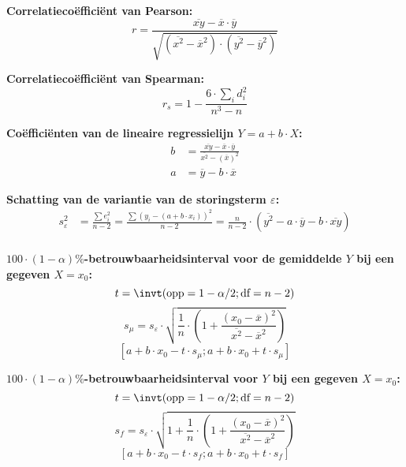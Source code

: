\textbf{Correlatieco\"effici\"ent van Pearson:}
\[
    r = \frac{\overline{xy} - \overline{x} \cdot \overline{y}}{\sqrt{(\overline{x^2} - \overline{x}^2)\cdot(\overline{y^2} - \overline{y}^2)}}
\]

\textbf{Correlatieco\"effici\"ent van Spearman:}
\[
    r_s = 1 - \frac{6 \cdot \sum_i d_i^2}{n^3-n}
\]

\textbf{Co\"effici\"enten van de lineaire regressielijn $Y = a + b\cdot X$:}
\begin{align*}
    b &= \frac{\overline{xy} - \overline{x} \cdot \overline{y}}{\overline{x^2} - (\overline{x})^2} \\
    a &= \overline{y} - b \cdot \overline{x}
\end{align*}

\textbf{Schatting van de variantie van de storingsterm $\varepsilon$:}
\begin{align*}
    s_{\varepsilon}^2 &= \frac{\sum e_i^2}{n - 2} = \frac{\sum \left(y_i - (a + b \cdot x_i)\right)^2}{n - 2}=  \frac{n}{n-2} \cdot \left( \overline{y^2} - a \cdot \overline{y} - b \cdot \overline{xy} \right) \\ 
\end{align*}

\textbf{\boldmath$100\cdot(1-\alpha)\%$-betrouwbaarheidsinterval voor de gemiddelde $Y$ bij een gegeven $X = x_0$:}
\[
    t = \invt(\text{opp} = 1 - \alpha/2; \text{df} = n - 2)
\]
\[
    s_\mu = s_{\varepsilon} \cdot \sqrt{ \frac{1}{n} \cdot \left( 1 + \frac{(x_0 - \overline{x})^2}{\overline{x^2} - \overline{x}^2} \right) }
\]
\[
    [a+b\cdot x_0 - t \cdot s_\mu; a+b\cdot x_0 + t \cdot s_\mu]
\]

\textbf{\boldmath$100\cdot(1-\alpha)\%$-betrouwbaarheidsinterval voor $Y$ bij een gegeven $X = x_0$:}
\[
    t = \invt(\text{opp} = 1 - \alpha/2; \text{df} = n - 2)
\]
\[
    s_f = s_{\varepsilon} \cdot \sqrt{ 1 + \frac{1}{n} \cdot \left( 1 + \frac{(x_0 - \overline{x})^2}{\overline{x^2} - \overline{x}^2} \right) }
\]
\[
    [a+b\cdot x_0 - t \cdot s_f; a+b\cdot x_0 + t \cdot s_f]
\]




